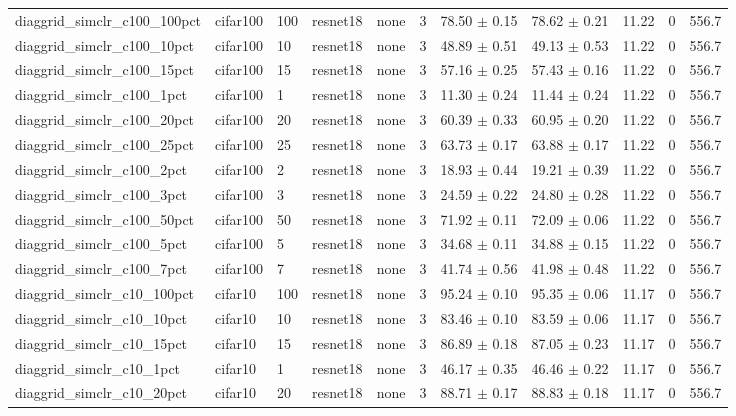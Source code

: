 \begin{tabular}{lllllllllll}
diaggrid_simclr_c100_100pct & cifar100 & 100 & resnet18 & none & 3 & 78.50 $\pm$ 0.15 & 78.62 $\pm$ 0.21 & 11.22 & 0 & 556.7 \\
diaggrid_simclr_c100_10pct & cifar100 & 10 & resnet18 & none & 3 & 48.89 $\pm$ 0.51 & 49.13 $\pm$ 0.53 & 11.22 & 0 & 556.7 \\
diaggrid_simclr_c100_15pct & cifar100 & 15 & resnet18 & none & 3 & 57.16 $\pm$ 0.25 & 57.43 $\pm$ 0.16 & 11.22 & 0 & 556.7 \\
diaggrid_simclr_c100_1pct & cifar100 & 1 & resnet18 & none & 3 & 11.30 $\pm$ 0.24 & 11.44 $\pm$ 0.24 & 11.22 & 0 & 556.7 \\
diaggrid_simclr_c100_20pct & cifar100 & 20 & resnet18 & none & 3 & 60.39 $\pm$ 0.33 & 60.95 $\pm$ 0.20 & 11.22 & 0 & 556.7 \\
diaggrid_simclr_c100_25pct & cifar100 & 25 & resnet18 & none & 3 & 63.73 $\pm$ 0.17 & 63.88 $\pm$ 0.17 & 11.22 & 0 & 556.7 \\
diaggrid_simclr_c100_2pct & cifar100 & 2 & resnet18 & none & 3 & 18.93 $\pm$ 0.44 & 19.21 $\pm$ 0.39 & 11.22 & 0 & 556.7 \\
diaggrid_simclr_c100_3pct & cifar100 & 3 & resnet18 & none & 3 & 24.59 $\pm$ 0.22 & 24.80 $\pm$ 0.28 & 11.22 & 0 & 556.7 \\
diaggrid_simclr_c100_50pct & cifar100 & 50 & resnet18 & none & 3 & 71.92 $\pm$ 0.11 & 72.09 $\pm$ 0.06 & 11.22 & 0 & 556.7 \\
diaggrid_simclr_c100_5pct & cifar100 & 5 & resnet18 & none & 3 & 34.68 $\pm$ 0.11 & 34.88 $\pm$ 0.15 & 11.22 & 0 & 556.7 \\
diaggrid_simclr_c100_7pct & cifar100 & 7 & resnet18 & none & 3 & 41.74 $\pm$ 0.56 & 41.98 $\pm$ 0.48 & 11.22 & 0 & 556.7 \\
diaggrid_simclr_c10_100pct & cifar10 & 100 & resnet18 & none & 3 & 95.24 $\pm$ 0.10 & 95.35 $\pm$ 0.06 & 11.17 & 0 & 556.7 \\
diaggrid_simclr_c10_10pct & cifar10 & 10 & resnet18 & none & 3 & 83.46 $\pm$ 0.10 & 83.59 $\pm$ 0.06 & 11.17 & 0 & 556.7 \\
diaggrid_simclr_c10_15pct & cifar10 & 15 & resnet18 & none & 3 & 86.89 $\pm$ 0.18 & 87.05 $\pm$ 0.23 & 11.17 & 0 & 556.7 \\
diaggrid_simclr_c10_1pct & cifar10 & 1 & resnet18 & none & 3 & 46.17 $\pm$ 0.35 & 46.46 $\pm$ 0.22 & 11.17 & 0 & 556.7 \\
diaggrid_simclr_c10_20pct & cifar10 & 20 & resnet18 & none & 3 & 88.71 $\pm$ 0.17 & 88.83 $\pm$ 0.18 & 11.17 & 0 & 556.7 \\

\end{tabular}
